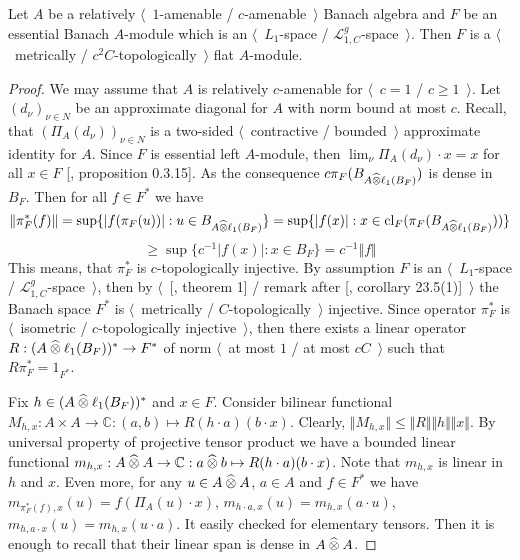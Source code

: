 \begin{proposition}\label{MetTopEssL1FlatModAoverAmenBanAlg} Let $A$ be a relatively $\langle$~$1$-amenable / $c$-amenable~$\rangle$ Banach algebra and $F$ be an essential Banach $A$-module which is an $\langle$~$L_1$-space / $\mathscr{L}_{1,C}^g$-space~$\rangle$. Then $F$ is a $\langle$~metrically / $c^2C$-topologically~$\rangle$ flat $A$-module.
\end{proposition}
\begin{proof} We may assume that $A$ is relatively $c$-amenable for $\langle$~$c=1$ / $c\geq 1$~$\rangle$. Let $(d_\nu)_{\nu\in N}$ be an approximate diagonal for $A$ with norm bound at most $c$. Recall, that $(\Pi_A(d_\nu))_{\nu\in N}$ is a two-sided $\langle$~contractive / bounded~$\rangle$ approximate identity for $A$. Since $F$ is essential left $A$-module, then $\lim_{\nu}\Pi_A(d_\nu)\cdot x=x$ for all $x\in F$ [\cite{HelHomolBanTopAlg}, proposition 0.3.15]. As the consequence $c\pi_F(B_{A\mathbin{\widehat{\otimes}}\ell_1(B_F)})$ is dense in $B_F$. Then for all $f\in F^*$ we have
$$
\Vert\pi_F^*(f)\Vert
=\sup\{|f(\pi_F(u))|:u\in B_{A\mathbin{\widehat{\otimes}}\ell_1(B_F)}\}
=\sup\{|f(x)|:x\in \operatorname{cl}_F(\pi_F(B_{A\mathbin{\widehat{\otimes}}\ell_1(B_F)}))\}
$$
$$
\geq\sup\{c^{-1}|f(x)|:x\in B_F\}=c^{-1}\Vert f\Vert
$$
This means, that $\pi_F^*$ is $c$-topologically injective. By assumption $F$ is an $\langle$~$L_1$-space / $\mathscr{L}_{1,C}^g$-space~$\rangle$, then by $\langle$~[\cite{GrothMetrProjFlatBanSp}, theorem 1] / remark after [\cite{DefFloTensNorOpId}, corollary 23.5(1)]~$\rangle$ the Banach space $F^*$ is $\langle$~metrically / $C$-topologically~$\rangle$ injective. Since operator $\pi_F^*$ is $\langle$~isometric / $c$-topologically injective~$\rangle$, then there exists a linear operator $R:(A\mathbin{\widehat{\otimes}}\ell_1(B_F))^*\to F^*$ of norm $\langle$~at most $1$ / at most $cC$~$\rangle$ such that $R\pi_F^*=1_{F^*}$.

Fix $h\in (A\mathbin{\widehat{\otimes}}\ell_1(B_F))^*$ and $x\in F$. Consider bilinear functional $M_{h,x}:A\times A\to\mathbb{C}:(a,b)\mapsto R(h\cdot a)(b\cdot x)$. Clearly, $\Vert M_{h,x}\Vert\leq\Vert R\Vert\Vert h\Vert\Vert x\Vert$. By universal property of projective tensor product we have a bounded linear functional $m_{h,x}:A\mathbin{\widehat{\otimes}} A\to\mathbb{C}:a\mathbin{\widehat{\otimes}} b\mapsto R(h\cdot a)(b\cdot x)$. Note that $m_{h,x}$ is linear in $h$ and $x$. Even more, for any $u\in A\mathbin{\widehat{\otimes}} A$, $a\in A$ and $f\in F^*$ we have $m_{\pi_F^*(f),x}(u)=f(\Pi_A(u)\cdot x)$, $m_{h\cdot a,x}(u)=m_{h,x}(a\cdot u)$, $m_{h,a\cdot x}(u)=m_{h,x}(u\cdot a)$. It easily checked for elementary tensors. Then it is enough to recall that their linear span is dense in $A\mathbin{\widehat{\otimes}} A$.


\end{proof}
